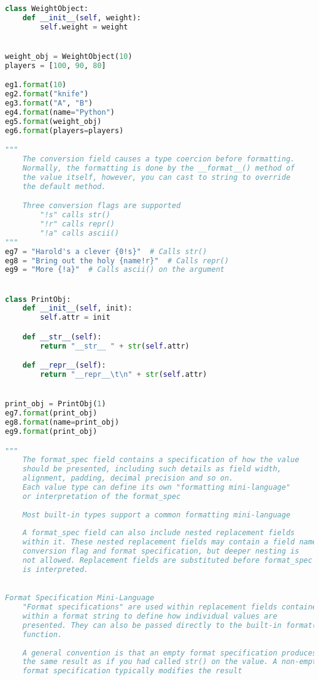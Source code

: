 \documentclass[a4paper,landscape]{report}
\begin{document}
\begin{lstlisting}[language=Python]
class WeightObject:
    def __init__(self, weight):
        self.weight = weight


weight_obj = WeightObject(10)
players = [100, 90, 80]

eg1.format(10)
eg2.format("knife")
eg3.format("A", "B")
eg4.format(name="Python")
eg5.format(weight_obj)
eg6.format(players=players)

"""
    The conversion field causes a type coercion before formatting.
    Normally, the formatting is done by the __format__() method of
    the value itself, however, you can cast to string to override
    the default method.

    Three conversion flags are supported
        "!s" calls str()
        "!r" calls repr()
        "!a" calls ascii()
"""
eg7 = "Harold's a clever {0!s}"  # Calls str()
eg8 = "Bring out the holy {name!r}"  # Calls repr()
eg9 = "More {!a}"  # Calls ascii() on the argument


class PrintObj:
    def __init__(self, init):
        self.attr = init

    def __str__(self):
        return "__str__ " + str(self.attr)

    def __repr__(self):
        return "__repr__\t\n" + str(self.attr)


print_obj = PrintObj(1)
eg7.format(print_obj)
eg8.format(name=print_obj)
eg9.format(print_obj)

"""
    The format_spec field contains a specification of how the value 
    should be presented, including such details as field width,
    alignment, padding, decimal precision and so on.
    Each value type can define its own "formatting mini-language"
    or interpretation of the format_spec
    
    Most built-in types support a common formatting mini-language
    
    A format_spec field can also include nested replacement fields
    within it. These nested replacement fields may contain a field name,
    conversion flag and format specification, but deeper nesting is
    not allowed. Replacement fields are substituted before format_spec
    is interpreted.
    

Format Specification Mini-Language
    "Format specifications" are used within replacement fields contained
    within a format string to define how individual values are 
    presented. They can also be passed directly to the built-in format()
    function.
    
    A general convention is that an empty format specification produces
    the same result as if you had called str() on the value. A non-empty
    format specification typically modifies the result
    

\end{lstlisting}
\end{document}

